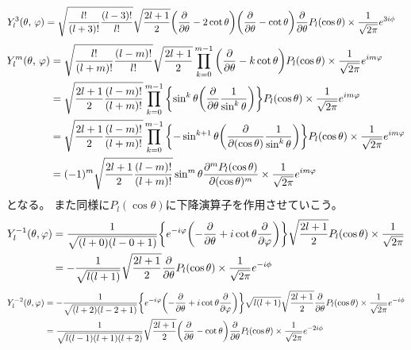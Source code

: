 \documentclass[../../master.tex]{subfiles}
\begin{document}
\begin{equation}\begin{aligned}[b]
    Y_l^3(\theta,\,\varphi)
	 & =\sqrt{\frac{l!}{(l+3)!}\frac{(l-3)!}{l!}}\sqrt{\frac{2l+1}{2}}\qty(\pdv{\theta}-2\cot\theta)\qty(\pdv{\theta}-\cot\theta)\pdv{\theta}P_l(\cos\theta)\times\frac{1}{\sqrt{2\pi}}e^{3i\phi}
\end{aligned}\end{equation}
\begin{equation}\begin{aligned}[b]
    Y_l^m(\theta,\,\varphi)
	 & =\sqrt{\frac{l!}{(l+m)!}\frac{(l-m)!}{l!}}\sqrt{\frac{2l+1}{2}} \prod_{k=0}^{m-1}\qty(\pdv{\theta}-k\cot\theta)P_l(\cos\theta)\times\frac{1}{\sqrt{2\pi}}e^{im\varphi}                    \\
	 & =\sqrt{\frac{2l+1}{2}\frac{(l-m)!}{(l+m)!}} \prod_{k=0}^{m-1}\qty{\sin^k\theta\qty(\pdv{\theta}\frac{1}{\sin^k\theta})}P_l(\cos\theta)\times\frac{1}{\sqrt{2\pi}}e^{im\varphi}            \\
	 & =\sqrt{\frac{2l+1}{2}\frac{(l-m)!}{(l+m)!}} \prod_{k=0}^{m-1}\qty{-\sin^{k+1}\theta\qty(\pdv{(\cos\theta)}\frac{1}{\sin^k\theta})}P_l(\cos\theta)\times\frac{1}{\sqrt{2\pi}}e^{im\varphi} \\
	 & =(-1)^m\sqrt{\frac{2l+1}{2}\frac{(l-m)!}{(l+m)!}} \sin^{m}\theta\pdv[m]{P_l(\cos\theta)}{(\cos\theta)}\times\frac{1}{\sqrt{2\pi}}e^{im\varphi}
\end{aligned}\end{equation}
となる。
また同様に\(P_l(\cos\theta)\)に下降演算子を作用させていこう。
\begin{equation}\begin{aligned}[b]
    Y_l^{-1}(\theta,\varphi)
	 & = \frac{1}{\sqrt{(l+0)(l-0+1)}}\qty{e^{-i\varphi}\qty(-\pdv{\theta}+i\cot\theta\pdv{\varphi})}\sqrt{\frac{2l+1}{2}}P_l(\cos\theta)\times\frac{1}{\sqrt{2\pi}} \\
	 & =	-\frac{1}{\sqrt{l(l+1)}}\sqrt{\frac{2l+1}{2}}\pdv{\theta}P_l(\cos\theta)\times\frac{1}{\sqrt{2\pi}}e^{-i\phi}
\end{aligned}\end{equation}
\begin{equation}\begin{aligned}[b]
    Y_l^{-2}(\theta,\varphi)
	 & =-\frac{1}{\sqrt{(l+2)(l-2+1)}}\qty{e^{-i\varphi}\qty(-\pdv{\theta}+i\cot\theta\pdv{\varphi})}\sqrt{l(l+1)}\sqrt{\frac{2l+1}{2}}\pdv{\theta}P_l(\cos\theta)\times\frac{1}{\sqrt{2\pi}}e^{-i\phi} \\
	 & =\frac{1}{\sqrt{l(l-1)(l+1)(l+2)}}\sqrt{\frac{2l+1}{2}}\qty(\pdv{\theta}-\cot\theta)\pdv{\theta}P_l(\cos\theta)\times\frac{1}{\sqrt{2\pi}}e^{-2i\phi}
\end{aligned}\end{equation}
\end{document}
